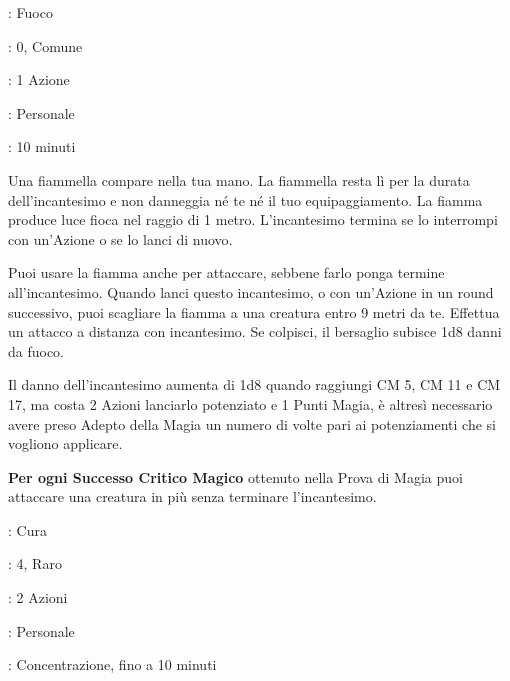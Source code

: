 \begin{multicols}{2}
\noindent\colorbox{OBSSgold!10}{
\begin{minipage}{0.95\linewidth}
\begin{description}[noitemsep, topsep=0pt, parsep=0pt, partopsep=0pt, leftmargin=0cm, labelwidth=1.3cm]
	\item[\textbf{Lista}]: Fuoco
	\item[\textbf{Livello}]: 0, Comune
	\item[\textbf{Lancio}]: 1 Azione
	\item[\textbf{Gittata}]: Personale
	\item[\textbf{Durata}]: 10 minuti
\end{description}
\end{minipage}}\smallskip

Una fiammella compare nella tua mano. La fiammella resta lì per la durata dell'incantesimo e non danneggia né te né il tuo equipaggiamento. La fiamma produce luce fioca nel raggio di 1 metro. L'incantesimo termina se lo interrompi con un'Azione o se lo lanci di nuovo.

Puoi usare la fiamma anche per attaccare, sebbene farlo ponga termine all'incantesimo. Quando lanci questo incantesimo, o con un'Azione in un round successivo, puoi scagliare la fiamma a una creatura entro 9 metri da te. Effettua un attacco a distanza con incantesimo. Se colpisci, il bersaglio subisce 1d8 danni da fuoco.

Il danno dell'incantesimo aumenta di 1d8 quando raggiungi CM 5, CM 11 e CM 17, ma costa 2 Azioni lanciarlo potenziato e 1 Punti Magia, è altresì necessario avere preso Adepto della Magia un numero di volte pari ai potenziamenti che si vogliono applicare.

\textbf{Per ogni Successo Critico Magico} ottenuto nella Prova di Magia puoi attaccare una creatura in più senza terminare l'incantesimo.

\label{Aura of Purity}
\noindent\colorbox{OBSSgold!10}{
\begin{minipage}{0.95\linewidth}
\begin{description}[noitemsep, topsep=0pt, parsep=0pt, partopsep=0pt, leftmargin=0cm, labelwidth=1.3cm]
	\item[\textbf{Lista di Magia}] : Cura
	\item[\textbf{Livello}] : 4, Raro
	\item[\textbf{T. di Lancio}] : 2 Azioni
	\item[\textbf{Gittata}] : Personale
	\item[\textbf{Durata}] : Concentrazione, fino a 10 minuti
\end{description}
\end{minipage}}\smallskip


\end{multicols}
